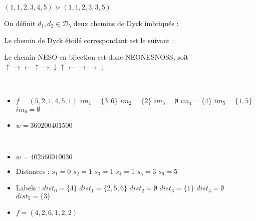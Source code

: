 \begin{example}[Définition 13 : $n = 6$]
    $(1, 1, 2, 3, 4, 5) \gtrdot (1, 1, 2, 3, 3, 5)$    
\end{example}

\begin{example}[Preuve du Théorème Principal : $n = 5$]
    On définit $d_1, d_2 \in \mathcal{D}_5$ deux chemins de Dyck
    imbriqués :
    
    Le chemin de Dyck étoilé correspondant est le suivant :
    
    Le chemin NESO en bijection est donc NEONESNOSS, soit
    $\uparrow \rightarrow \leftarrow \uparrow \rightarrow \downarrow
    \uparrow \leftarrow \rightarrow \rightarrow$ :
    
\end{example}

\begin{example}[Proposition 15 : $n = 6, \mathcal{PF}_6 \to \mathcal{LD}_6$]
    ~\
    \begin{itemize}
        \item $f = (5, 2, 1, 4, 5, 1)$
            \subitem $im_1 = \{3, 6\}$
            \hspace{16mm} $im_2 = \{2\}$
            \hspace{24mm} $im_3 = \emptyset$
            \subitem $im_4 = \{4\}$
            \hspace{2cm} $im_5 = \{1, 5\}$
            \hspace{2cm} $im_6 = \emptyset$
        \item $w = 360200401500$
    \end{itemize}
    
\end{example}

\begin{example}[Proposition 15 : $n = 6, \mathcal{LD}_6 \to \mathcal{PF}_6$]
    ~\
    \begin{itemize}
        \item $w = 402560010030$
    \end{itemize}
    
    \begin{itemize}
        \item Distances :
            \subitem $s_1 = 0$
            \hspace{2cm} $s_2 = 1$
            \hspace{2cm} $s_3 = 1$
            \subitem $s_4 = 1$
            \hspace{2cm} $s_5 = 3$
            \hspace{2cm} $s_6 = 5$
        \item Labels :
            \subitem $dist_0 = \{4\}$
            \hspace{2cm} $dist_1 = \{2, 5, 6\}$
            \hspace{2cm} $dist_2 = \emptyset$
            \subitem $dist_3 = \{1\}$
            \hspace{2cm} $dist_4 = \emptyset$
            \hspace{32mm} $dist_5 = \{3\}$
        \item $f = (4, 2, 6, 1, 2, 2)$
    \end{itemize}
\end{example}

